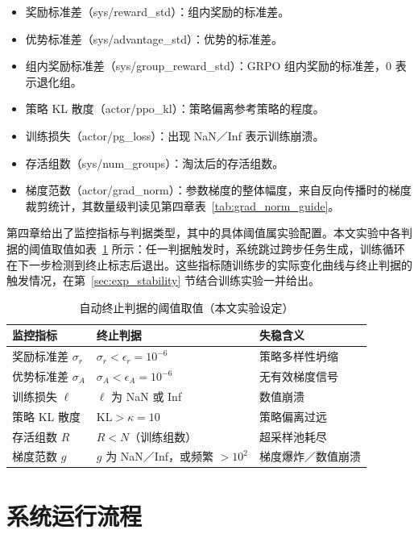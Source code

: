 \begin{itemize}
    \item 奖励标准差（sys/reward\_std）：组内奖励的标准差。
    \item 优势标准差（sys/advantage\_std）：优势的标准差。
    \item 组内奖励标准差（sys/group\_reward\_std）：GRPO 组内奖励的标准差，0 表示退化组。
    \item 策略 KL 散度（actor/ppo\_kl）：策略偏离参考策略的程度。
    \item 训练损失（actor/pg\_loss）：出现 NaN／Inf 表示训练崩溃。
    \item 存活组数（sys/num\_groups）：淘汰后的存活组数。
    \item 梯度范数（actor/grad\_norm）：参数梯度的整体幅度，来自反向传播时的梯度裁剪统计，其数量级判读见第四章表~\ref{tab:grad_norm_guide}。
\end{itemize}

第四章给出了监控指标与判据类型，其中的具体阈值属实验配置。本文实验中各判据的阈值取值如表~\ref{tab:stop_thresholds} 所示：任一判据触发时，系统跳过跨步任务生成，训练循环在下一步检测到终止标志后退出。这些指标随训练步的实际变化曲线与终止判据的触发情况，在第~\ref{sec:exp_stability} 节结合训练实验一并给出。

\begin{table}[htbp]
    \centering
    \caption{自动终止判据的阈值取值（本文实验设定）}
    \label{tab:stop_thresholds}
    \begin{tabular}{lll}
        \hline
        监控指标 & 终止判据 & 失稳含义 \\
        \hline
        奖励标准差 $\sigma_r$ & $\sigma_r < \epsilon_r = 10^{-6}$ & 策略多样性坍缩 \\
        优势标准差 $\sigma_A$ & $\sigma_A < \epsilon_A = 10^{-6}$ & 无有效梯度信号 \\
        训练损失 $\ell$ & $\ell$ 为 NaN 或 Inf & 数值崩溃 \\
        策略 KL 散度 & $\text{KL} > \kappa = 10$ & 策略偏离过远 \\
        存活组数 $R$ & $R < N$（训练组数） & 超采样池耗尽 \\
        梯度范数 $g$ & $g$ 为 NaN／Inf，或频繁 $> 10^{2}$ & 梯度爆炸／数值崩溃 \\
        \hline
    \end{tabular}
\end{table}

\section{系统运行流程}

